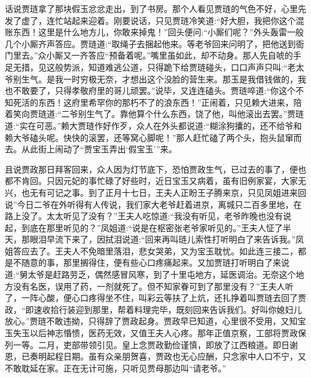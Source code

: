 

\begin{parag}
    话说贾琏拿了那块假玉忿忿走出，到了书房。那个人看见贾琏的气色不好，心里先发了虚了，连忙站起来迎着。刚要说话，只见贾琏冷笑道:“好大胆，我把你这个混账东西！这里是什么地方儿，你敢来掉鬼！”回头便问:“小厮们呢？”外头轰雷一般几个小厮齐声答应。贾琏道:“取绳子去捆起他来。等老爷回来问明了，把他送到衙门里去。”众小厮又一齐答应“预备着呢。”嘴里虽如此，却不动身。那人先自唬的手足无措，见这般势派，知道难逃公道，只得跪下给贾琏碰头，口口声声只叫:“老太爷别生气。是我一时穷极无奈，才想出这个没脸的营生来。那玉是我借钱做的，我也不敢要了，只得孝敬府里的哥儿顽罢。”说毕，又连连磕头。贾琏啐道:“你这个不知死活的东西！这府里希罕你的那朽不了的浪东西！”正闹着，只见赖大进来，陪着笑向贾琏道:“二爷别生气了。靠他算个什么东西，饶了他，叫他滚出去罢。”贾琏道:“实在可恶。”赖大贾琏作好作歹，众人在外头都说道:“糊涂狗攮的，还不给爷和赖大爷磕头呢。快快的滚罢，还等窝心脚呢！”那人赶忙磕了两个头，抱头鼠窜而去。从此街上闹动了“贾宝玉弄出‘假宝玉’”来。
\end{parag}


\begin{parag}
    且说贾政那日拜客回来，众人因为灯节底下，恐怕贾政生气，已过去的事了，便也都不肯回。只因元妃的事忙碌了好些时，近日宝玉又病着，虽有旧例家宴，大家无兴，也无有可记之事。到了正月十七日，王夫人正盼王子腾来京，只见凤姐进来回说”今日二爷在外听得有人传说，我们家大老爷赶着进京，离城只二百多里地，在路上没了。太太听见了没有？”王夫人吃惊道:“我没有听见，老爷昨晚也没有说起，到底在那里听见的？”凤姐道:“说是在枢密张老爷家听见的。”王夫人怔了半天，那眼泪早流下来了，因拭泪说道:“回来再叫琏儿索性打听明白了来告诉我。”凤姐答应去了。王夫人不免暗里落泪，悲女哭弟，又为宝玉耽忧。如此连三接二，都是不随意的事，那里搁得住，便有些心口疼痛起来。又加贾琏打听明白了来说道:“舅太爷是赶路劳乏，偶然感冒风寒，到了十里屯地方，延医调治。无奈这个地方没有名医，误用了药，一剂就死了。但不知家眷可到了那里没有？”王夫人听了，一阵心酸，便心口疼得坐不住，叫彩云等扶了上炕，还扎挣着叫贾琏去回了贾政，“即速收拾行装迎到那里，帮着料理完毕，既刻回来告诉我们。好叫你媳妇儿放心。”贾琏不敢违拗，只得辞了贾政起身。贾政早已知道，心里很不受用，又知宝玉失玉以后神志惛愦，医药无效，又值王夫人心疼。那年正值京察，工部将贾政保列一等。二月，吏部带领引见。皇上念贾政勤俭谨慎，即放了江西粮道。即日谢恩，已奏明起程日期。虽有众亲朋贺喜，贾政也无心应酬，只念家中人口不宁，又不敢耽延在家。正在无计可施，只听见贾母那边叫“请老爷。”
\end{parag}


